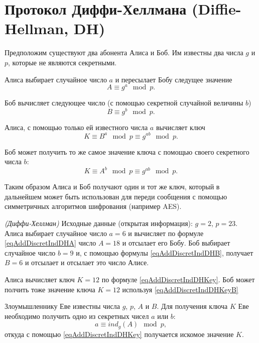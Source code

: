 \section{Протокол Диффи-Хеллмана (Diffie-Hellman, DH)}
\label{sec:add:dm:dh}
Предположим существуют два абонента Алиса и Боб. Им известны два числа
$g$ и $p$, которые не являются секретными.

Алиса выбирает случайное число $a$ и пересылает Бобу следущее значение
\begin{equation}
A \equiv g^a \mod{p}.
\label{eqAddDiscretIndDHA}
\end{equation}

Боб вычисляет следующее число (с помощью секретной случайной величины
$b$)
\begin{equation}
B \equiv g^b \mod{p}.
\label{eqAddDiscretIndDHB}
\end{equation}

Алиса, с помощью только ей известного числа $a$ вычисляет ключ
\begin{equation}
K \equiv B^a\mod{p} \equiv g^{ab} \mod{p}.
\label{eqAddDiscretIndDHKey}
\end{equation}

Боб может получить то же самое значение ключа с помощью своего
секретного числа $b$:
\begin{equation}
K \equiv A^b\mod{p} \equiv g^{ab} \mod{p}.
\label{eqAddDiscretIndDHKeyB}
\end{equation}

Таким образом Алиса и Боб получают один и тот же ключ, который в
дальнейшем может быть использован для переди сообщения с помощью
симметричных алгоритмов шифрования (например AES).

\begin{example}
\emph{(Диффи-Хеллман)}
Исходные данные (открытая информация): $g = 2$, $p = 23$. Алиса
выбирает случайное число $a = 6$ и вычисляет по формуле
\eqref{eqAddDiscretIndDHA} число 
$A = 18$ и отсылает его Бобу.
Боб выбирает случайное число $b=9$ и, с помощью формулы 
\eqref{eqAddDiscretIndDHB}, получает
$B = 6$ и отсылает и отсылает это число Алисе.

Алиса вычисляет ключ 
$K = 12$ по формуле \eqref{eqAddDiscretIndDHKey}. Боб может полчить
тоже значение ключа 
$K = 12$ используя \eqref{eqAddDiscretIndDHKeyB}
\nonumber
\end{example}

Злоумышленнику Еве известны числа $g$, $p$, $A$ и $B$. Для получения
ключа $K$ Еве необходимо получить одно из секретных чисел $a$ или $b$:
\begin{equation}
a \equiv ind_g\left( A \right) \mod{p},
\nonumber
\end{equation}
откуда с помощью \eqref{eqAddDiscretIndDHKey} получается искомое
значение $K$.
